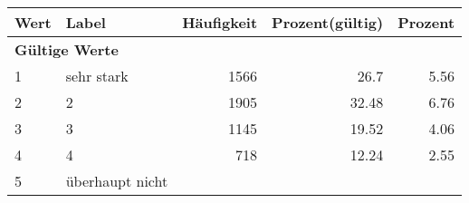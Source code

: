      \begin{longtable}{lXrrr}
     \toprule
     \textbf{Wert} & \textbf{Label} & \textbf{Häufigkeit} & \textbf{Prozent(gültig)} & \textbf{Prozent} \\
     \endhead
     \midrule
     \multicolumn{5}{l}{\textbf{Gültige Werte}}\\

     1 &
     \multicolumn{1}{X}{ sehr stark   } &


       \num{1566} &
       \num[round-mode=places,round-precision=2]{26,7} &
         \num[round-mode=places,round-precision=2]{5,56} \\

     2 &
     \multicolumn{1}{X}{ 2   } &


       \num{1905} &
       \num[round-mode=places,round-precision=2]{32,48} &
         \num[round-mode=places,round-precision=2]{6,76} \\

     3 &
     \multicolumn{1}{X}{ 3   } &


       \num{1145} &
       \num[round-mode=places,round-precision=2]{19,52} &
         \num[round-mode=places,round-precision=2]{4,06} \\

     4 &
     \multicolumn{1}{X}{ 4   } &


       \num{718} &
       \num[round-mode=places,round-precision=2]{12,24} &
         \num[round-mode=places,round-precision=2]{2,55} \\

     5 &
     \multicolumn{1}{X}{ überhaupt nicht   } &



\end{longtable}
